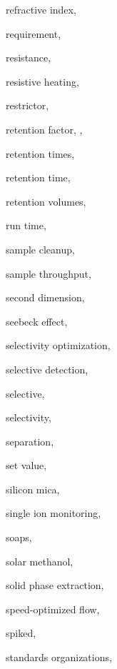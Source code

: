 \begin{theindex}
  \item \lowercase {refractive index}, 
  \item \lowercase {requirement}, 
  \item \lowercase {resistance}, 
  \item \lowercase {resistive heating}, 
  \item \lowercase {restrictor}, 
  \item \lowercase {retention factor}, , 
  \item \lowercase {retention times}, 
  \item \lowercase {retention time}, 
  \item \lowercase {retention volumes}, 
  \item \lowercase {run time}, 
  \item \lowercase {sample cleanup}, 
  \item \lowercase {sample throughput}, 
  \item \lowercase {second dimension}, 
  \item \lowercase {Seebeck effect}, 
  \item \lowercase {selectivity optimization}, 
  \item \lowercase {selective detection}, 
  \item \lowercase {selective}, 
  \item \lowercase {selectivity}, 
  \item \lowercase {separation}, 
  \item \lowercase {set value}, 
  \item \lowercase {silicon mica}, 
  \item \lowercase {single ion monitoring}, 
  \item \lowercase {soaps}, 
  \item \lowercase {solar methanol}, 
  \item \lowercase {solid phase extraction}, 
  \item \lowercase {speed-optimized flow}, 
  \item \lowercase {spiked}, 
  \item \lowercase {standards organizations}, 

\end{theindex}
